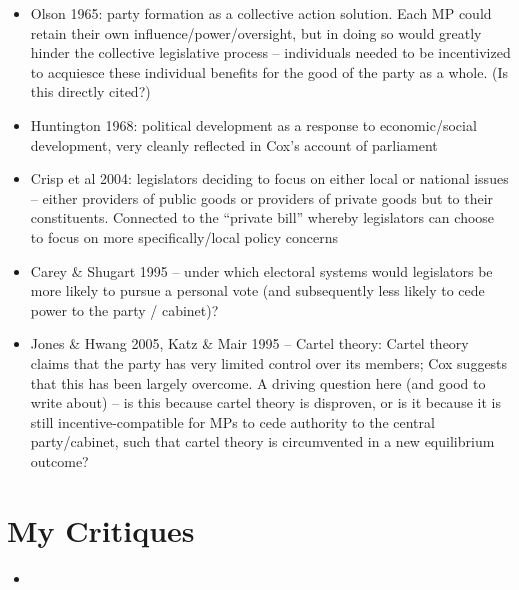 \documentclass[12pt]{article}
\begin{document}
\begin{itemize}
    \item Olson 1965: party formation as a collective action solution. Each MP could retain their own influence/power/oversight, but in doing so would greatly hinder the collective legislative process -- individuals needed to be incentivized to acquiesce these individual benefits for the good of the party as a whole. (Is this directly cited?)
    \item Huntington 1968: political development as a response to economic/social development, very cleanly reflected in Cox's account of parliament
    \item Crisp et al 2004: legislators deciding to focus on either local or national issues -- either providers of public goods or providers of private goods but to their constituents. Connected to the ``private bill'' whereby legislators can choose to focus on more specifically/local policy concerns
    \item Carey \& Shugart 1995 -- under which electoral systems would legislators be more likely to pursue a personal vote (and subsequently less likely to cede power to the party / cabinet)?
    \item Jones \& Hwang 2005, Katz \& Mair 1995 -- Cartel theory: Cartel theory claims that the party has very limited control over its members; Cox suggests that this has been largely overcome. A driving question here (and good to write about) -- is this because cartel theory is disproven, or is it because it is still incentive-compatible for MPs to cede authority to the central party/cabinet, such that cartel theory is circumvented in a new equilibrium outcome?
\end{itemize}


\section{My Critiques}

\begin{itemize}
    \item
\end{itemize}
\end{document}
